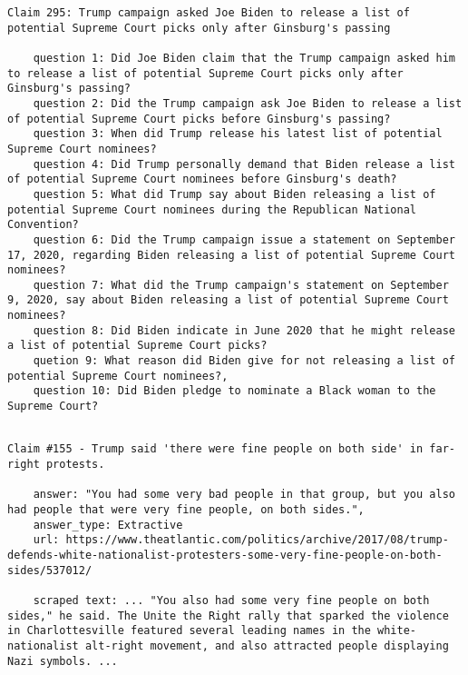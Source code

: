 \begin{lstlisting}[caption={Example of a claim and questions showing that the last tends to be unrelated or redundant to fact-checking of the claim.}, label={lst:unrelated_questions}, breaklines=true, breakatwhitespace=false, columns=fullflexible]
    Claim 295: Trump campaign asked Joe Biden to release a list of potential Supreme Court picks only after Ginsburg's passing

    question 1: Did Joe Biden claim that the Trump campaign asked him to release a list of potential Supreme Court picks only after Ginsburg's passing?
    question 2: Did the Trump campaign ask Joe Biden to release a list of potential Supreme Court picks before Ginsburg's passing?
    question 3: When did Trump release his latest list of potential Supreme Court nominees?
    question 4: Did Trump personally demand that Biden release a list of potential Supreme Court nominees before Ginsburg's death?
    question 5: What did Trump say about Biden releasing a list of potential Supreme Court nominees during the Republican National Convention?
    question 6: Did the Trump campaign issue a statement on September 17, 2020, regarding Biden releasing a list of potential Supreme Court nominees?
    question 7: What did the Trump campaign's statement on September 9, 2020, say about Biden releasing a list of potential Supreme Court nominees?
    question 8: Did Biden indicate in June 2020 that he might release a list of potential Supreme Court picks?
    quetion 9: What reason did Biden give for not releasing a list of potential Supreme Court nominees?,
    question 10: Did Biden pledge to nominate a Black woman to the Supreme Court?
    
\end{lstlisting}

\begin{lstlisting}[caption={Example of a claim where our pipeline did not exactly extract the answer.}, label={lst:extractive_error}, breaklines=true, breakatwhitespace=false, columns=fullflexible]
    Claim #155 - Trump said 'there were fine people on both side' in far-right protests.

    answer: "You had some very bad people in that group, but you also had people that were very fine people, on both sides.", 
    answer_type: Extractive
    url: https://www.theatlantic.com/politics/archive/2017/08/trump-defends-white-nationalist-protesters-some-very-fine-people-on-both-sides/537012/

    scraped text: ... "You also had some very fine people on both sides," he said. The Unite the Right rally that sparked the violence in Charlottesville featured several leading names in the white-nationalist alt-right movement, and also attracted people displaying Nazi symbols. ...
    
\end{lstlisting}